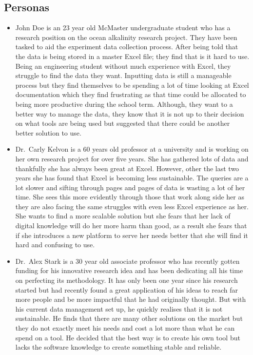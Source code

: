 \documentclass[12pt]{article}
\begin{document}
\subsection{Personas}
\begin{itemize}
  \item John Doe is an 23 year old McMaster undergraduate student who has a
  research position on the ocean alkalinity research project. They have been
  tasked to aid the experiment data collection process. After being told that
  the data is being stored in a master Excel file; they find that is it hard to
  use. Being an engineering student without much experience with Excel, they
  struggle to find the data they want. Inputting data is still a manageable
  process but they find themselves to be spending a lot of time looking at Excel
  documentation which they find frustrating as that time could be allocated to
  being more productive during the school term. Although, they want to a better
  way to manage the data, they know that it is not up to their decision on what
  tools are being used but suggested that there could be another better solution
  to use. 
  \item Dr.\ Carly Kelvon is a 60 years old professor at a university and is
  working on her own research project for over five years. She has gathered lots
  of data and thankfully she has always been great at Excel. However, other the
  last two years she has found that Excel is becoming less sustainable. The
  queries are a lot slower and sifting through pages and pages of data is
  wasting a lot of her time. She sees this more evidently through those that
  work along side her as they are also facing the same struggles with even less
  Excel experience as her. She wants to find a more scalable solution but she
  fears that her lack of digital knowledge will do her more harm than good, as a
  result she fears that if she introduces a new platform to serve her needs
  better that she will find it hard and confusing to use. 
  \item Dr.\ Alex Stark is a 30 year old associate professor who has recently
  gotten funding for his innovative research idea and has been dedicating all
  his time on perfecting its methodology. It has only been one year since his
  research started but had recently found a great application of his ideas to
  reach far more people and be more impactful that he had originally thought.
  But with his current data management set up, he quickly realises that it is
  not sustainable. He finds that there are many other solutions on the market
  but they do not exactly meet his needs and cost a lot more than what he can
  spend on a tool. He decided that the best way is to create his own tool but
  lacks the software knowledge to create something stable and reliable. 
\end{itemize}
    
\end{document}
